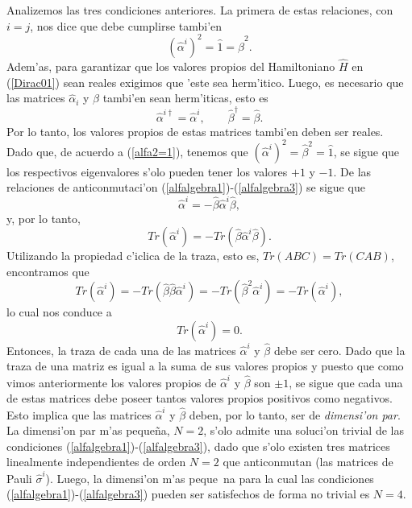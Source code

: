 Analizemos las tres condiciones anteriores. La primera de estas relaciones, con
$i=j$, nos dice que debe cumplirse
tambi'en 
\begin{equation}
(\hat{\alpha}^i)^2=\hat{1}=\hat{\beta}^2. \label{alfa2=1}
\end{equation}
Adem'as, para garantizar que los valores propios del Hamiltoniano $\hat{H}$ en
(\ref{Dirac01}) sean reales exigimos que 'este sea herm'itico. Luego, es
necesario que las matrices $\hat{\alpha}_i$ y $\hat{\beta}$ tambi'en sean
herm'iticas, esto es
\begin{equation}
\hat{\alpha}^{i\dagger }=\hat{\alpha}^i,\qquad \hat{\beta}^{\dagger }=
\hat{\beta}.
\end{equation}
Por lo tanto, los valores propios de estas matrices tambi'en deben ser reales.
Dado que, de
acuerdo a (\ref{alfa2=1}), tenemos que $(\hat{\alpha}^i)^2=\hat{\beta}^2=
\hat{1}$, se sigue que los respectivos eigenvalores s'olo pueden tener
los valores $+1$ y $-1$. De las relaciones de anticonmutaci'on
(\ref{alfalgebra1})-(\ref{alfalgebra3}) se sigue que
\begin{equation}
\hat{\alpha}^i=-\hat{\beta}\hat{\alpha}^i\hat{\beta},
\end{equation}
y, por lo tanto, 
\begin{equation}
{Tr}\left( \hat{\alpha}^i\right) =-{Tr}\left( \hat{\beta}%
\hat{\alpha}^i\hat{\beta}\right).
\end{equation}
Utilizando la propiedad c'iclica de la traza, esto es, ${Tr}\left( ABC\right)
={Tr}\left( CAB\right) $, encontramos que
\begin{equation}
{Tr}\left( \hat{\alpha}^i\right) =-{Tr}\left(
\hat{\beta}\hat{\beta}\hat{\alpha}^i\right) =-{Tr}\left(
\hat{\beta}^2\hat{\alpha}^i\right) =-{Tr}\left( \hat{\alpha}^i\right) ,
\end{equation}
lo cual nos conduce a 
\begin{equation}
{Tr}\left( \hat{\alpha}^i\right) =0.
\end{equation}
Entonces, la traza de cada una de las matrices $\hat{\alpha}^i$ y
$\hat{\beta}$ debe ser cero. Dado que la traza de una matriz es igual a la suma
de sus valores propios y puesto que como vimos anteriormente los valores propios
de $\hat{\alpha}^i$ y $\hat{\beta}$ son $\pm 1$, se sigue que cada una de
estas matrices debe poseer tantos valores propios positivos como negativos. Esto
implica que las matrices $\hat{\alpha}^i$ y $\hat{\beta}$ deben, por
lo tanto, ser de \textit{dimensi'on par}. La dimensi'on par m'as peque\~{n}a,
$N=2$, s'olo admite una soluci'on trivial de las condiciones
(\ref{alfalgebra1})-(\ref{alfalgebra3}), dado que s'olo existen tres matrices
linealmente independientes de orden $N=2$ que anticonmutan (las matrices de
Pauli $\hat{\sigma}^i$). Luego, la dimensi'on m'as peque~na para la cual las
condiciones (\ref{alfalgebra1})-(\ref{alfalgebra3}) pueden ser satisfechos de
forma no trivial es $N=4$.


